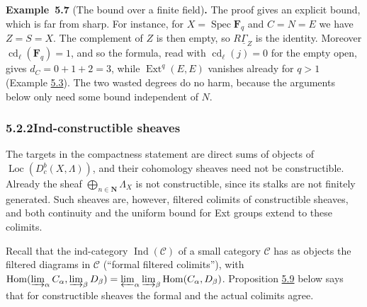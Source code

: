 \documentclass[11pt]{article}
\newenvironment{bpstatement}[2]{\par\addvspace{0.6\baselineskip}\noindent\textbf{#1}#2\textbf{.}\enspace\ignorespaces}
  {\par\addvspace{0.4\baselineskip}}
\providecommand{\Dbc}{}\renewcommand{\Dbc}{D^b_c}
\providecommand{\Ext}{}\renewcommand{\Ext}{\operatorname{Ext}}
\providecommand{\Hom}{}\renewcommand{\Hom}{\operatorname{Hom}}
\providecommand{\Loc}{}\renewcommand{\Loc}{\operatorname{Loc}}
\begin{document}
\label{bp429}%
\begin{bpstatement}{Example~5.7}{ (The bound over a finite field)}
The proof gives an explicit bound, which is far from sharp. For instance, for \(X=\operatorname{Spec}\mathbf F_q\) and \(C=N=E\) we have \(Z=S=X\). The complement of \(Z\) is then empty, so \(R\underline\Gamma_Z\) is the identity. Moreover \(\operatorname{cd}_\ell(\mathbf F_q)=1\), and so the formula, read with \(\operatorname{cd}_\ell(j)=0\) for the empty open, gives \(d_C=0+1+2=3\), while \(\Ext^q(E,E)\) vanishes already for \(q>1\) (Example \hyperref[bp417]{5.3}). The two wasted degrees do no harm, because the arguments below only need some bound independent of \(N\).
\end{bpstatement}


\subsubsection*{\texorpdfstring{5.2.2\quad Ind-constructible sheaves}{5.2.2 Ind-constructible sheaves}}
\label{bp430}%
\label{bp431}%
The targets in the compactness statement are direct sums of objects of \(\Loc(\Dbc(X,\Lambda))\), and their cohomology sheaves need not be constructible. Already the sheaf \(\bigoplus_{n\in\mathbf N}\Lambda_X\) is not constructible, since its stalks are not finitely generated. Such sheaves are, however, filtered colimits of constructible sheaves, and both continuity and the uniform bound for Ext groups extend to these colimits.

Recall that the ind-category \(\operatorname{Ind}(\mathcal C)\) of a small category \(\mathcal C\) has as objects the filtered diagrams in \(\mathcal C\) (“formal filtered colimits”), with \(\Hom(\varinjlim_\alpha C_\alpha,\varinjlim_\beta D_\beta)
=\varprojlim_\alpha\varinjlim_\beta\Hom(C_\alpha,D_\beta)\). Proposition \hyperref[bp433]{5.9} below says that for constructible sheaves the formal and the actual colimits agree.
\end{document}

